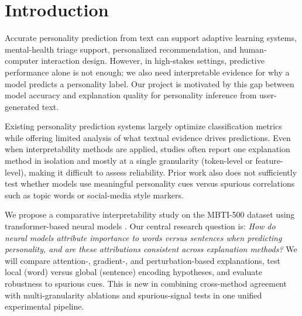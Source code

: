 \documentclass[sigplan,screen]{acmart}
\begin{document}




\maketitle

\pagestyle{fancy}
\fancyhf{}
\fancyhead[LE]{\small\itshape\shortauthors}
\fancyhead[RO]{\small\itshape\shorttitle}
\fancyfoot[C]{\thepage}

\section{Introduction}
Accurate personality prediction from text can support adaptive learning systems, mental-health triage support, personalized recommendation, and human-computer interaction design. However, in high-stakes settings, predictive performance alone is not enough; we also need interpretable evidence for why a model predicts a personality label. Our project is motivated by this gap between model accuracy and explanation quality for personality inference from user-generated text.

Existing personality prediction systems largely optimize classification metrics while offering limited analysis of what textual evidence drives predictions. Even when interpretability methods are applied, studies often report one explanation method in isolation and mostly at a single granularity (token-level or feature-level), making it difficult to assess reliability. Prior work also does not sufficiently test whether models use meaningful personality cues versus spurious correlations such as topic words or social-media style markers.

We propose a comparative interpretability study on the MBTI-500 dataset \cite{mbti500_kaggle} using transformer-based neural models \cite{devlin2019bert}. Our central research question is: \textit{How do neural models attribute importance to words versus sentences when predicting personality, and are these attributions consistent across explanation methods?} We will compare attention-, gradient-, and perturbation-based explanations, test local (word) versus global (sentence) encoding hypotheses, and evaluate robustness to spurious cues. This is new in combining cross-method agreement with multi-granularity ablations and spurious-signal tests in one unified experimental pipeline.
\end{document}
